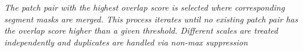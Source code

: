 \cite{liu2016multi} \emph{The patch pair with the highest overlap score is selected where corresponding segment masks are merged. This process iterates until no existing patch pair has the overlap score higher than a given threshold. Different scales are treated independently and duplicates are handled via non-max suppression}




